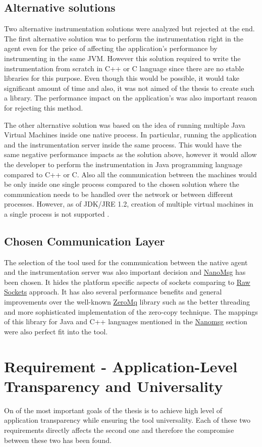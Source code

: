 \subsection{Alternative solutions}
Two alternative instrumentation solutions were analyzed but rejected at the end. The first alternative solution was to perform the instrumentation right in the agent even for the price of affecting the application's performance by instrumenting in the same JVM. However this solution required to write the instrumentation from scratch in C++ or C language since there are no stable libraries for this purpose. Even though this would be possible, it would take significant amount of time and also, it was not aimed of the thesis to create such a library. The performance impact on the application's was also important reason for rejecting this method.

The other alternative solution was based on the idea of running multiple Java Virtual Machines inside one native process. In particular, running the application and the instrumentation server inside the same process. This would have the same  negative performance impacts as the solution above, however it would allow the developer to perform the instrumentation in Java programming language compared to C++ or C. Also all the communication between the machines would be only inside one single process compared to the chosen solution where the communication needs to be handled over the network or between different processes. However, as of JDK/JRE 1.2, creation of multiple virtual machines in a single process is not supported \cite{MoreJVMOnceProccess}.
							
\subsection{Chosen Communication Layer}
The selection of the tool used for the communication between the native agent and the instrumentation server was also important decision and \hyperref[nanomsg]{NanoMsg} has been chosen. It hides the platform specific aspects of sockets comparing to \hyperref[raw_sockets]{Raw Sockets} approach. It has also several performance benefits and general improvements over the well-known \hyperref[zeromq]{ZeroMq} library such as the better threading and more sophisticated implementation of the zero-copy technique. The mappings of this library for Java and C++ languages mentioned in the \hyperref[nanomsg]{Nanomsg} section were also perfect fit into the tool.
		

\section{Requirement - Application-Level \newline Transparency and Universality}
On of the most important goals of the thesis is to achieve high level of application transparency while ensuring the tool universality. Each of these two requirements directly affects the second one and therefore the compromise between these two has been found.


